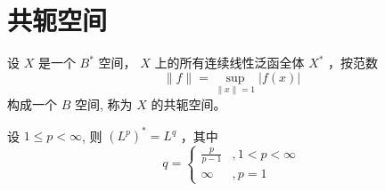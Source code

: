 \documentclass[lang=cn,newtx,10pt,scheme=chinese,thmcnt=chapter]{elegantbook}
\begin{document}
\section{共轭空间}
\begin{definition}
设 $X$ 是一个 $B^*$ 空间， $X$ 上的所有连续线性泛函全体 $X ^*$ ，按范数
\begin{equation*}
\|f\|=\sup _{\|x\|=1}|f(x)|
\end{equation*}
构成一个 $B$ 空间, 称为 $X$ 的共轭空间。
\end{definition}
\begin{theorem}[Riesz]
设 $1 \leqslant p<\infty$, 则 $\left(L^p\right)^*=L^q$ ，其中
\begin{equation*}
q= \begin{cases}\frac{p}{p-1} & , 1<p<\infty \\ \infty & , p=1\end{cases}
\end{equation*}
\end{theorem}
\end{document}
